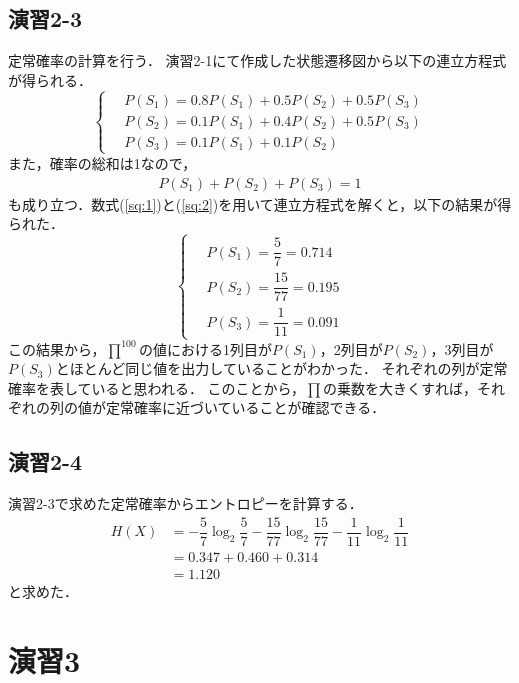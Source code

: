 \documentclass[documentclass]{jsarticle}
\begin{document}
\subsection*{演習2-3}
定常確率の計算を行う．
演習2-1にて作成した状態遷移図から以下の連立方程式が得られる．
\begin{equation}
  \left\{ \,
      \begin{aligned}
      & P(S_1) = 0.8P(S_1) + 0.5P(S_2) + 0.5P(S_3) \\
      & P(S_2) = 0.1P(S_1) + 0.4P(S_2) + 0.5P(S_3) \\
      & P(S_3) = 0.1P(S_1) + 0.1P(S_2) \label{sq:1}
      \end{aligned}
  \right.
\end{equation}
また，確率の総和は1なので，
\begin{align}
  P(S_1) + P(S_2) + P(S_3) = 1 \label{sq:2}
\end{align}
も成り立つ．数式(\ref*{sq:1})と(\ref*{sq:2})を用いて連立方程式を解くと，以下の結果が得られた．
\begin{equation*}
  \left\{ \,
    \begin{aligned}
      &P(S_1) = \dfrac{5}{7} = 0.714\\
      &P(S_2) = \dfrac{15}{77} = 0.195\\
      &P(S_3) = \dfrac{1}{11} = 0.091
    \end{aligned}
  \right.
\end{equation*}
この結果から，$\prod^{100}$の値における1列目が$P(S_1)$，2列目が$P(S_2)$，3列目が$P(S_3)$とほとんど同じ値を出力していることがわかった．
それぞれの列が定常確率を表していると思われる． 
このことから，$\prod$の乗数を大きくすれば，それぞれの列の値が定常確率に近づいていることが確認できる．


\subsection*{演習2-4}
演習2-3で求めた定常確率からエントロピーを計算する．
\begin{align*}
  H(X) &= -\dfrac{5}{7} \log_2 \dfrac{5}{7} -\dfrac{15}{77} \log_2 \dfrac{15}{77} - \dfrac{1}{11} \log_2 \dfrac{1}{11}\\ 
  &= 0.347 + 0.460 + 0.314\\
  &= 1.120
\end{align*}
と求めた．

\newpage

\section*{演習3}
\end{document}
